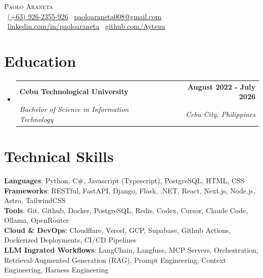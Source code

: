 \documentclass[letterpaper,11pt]{article}
\makeatletter
\newcommand{\resumeSubheading}[4]{
  \vspace{-2pt}\item
    \begin{tabular*}{1.0\textwidth}[t]{l@{\extracolsep{\fill}}r}
      \textbf{#1} & \textbf{\small #2} \\
      \textit{\small#3} & \textit{\small #4} \\
    \end{tabular*}\vspace{-7pt}
}
\newcommand{\resumeSubHeadingListStart}{\begin{itemize}[leftmargin=0.0in, label={}]}
\newcommand{\resumeSubHeadingListEnd}{\end{itemize}}\vspace{0pt}
\makeatother
\begin{document}
\begin{center}
    {\Large \scshape Paolo Araneta} \\[2mm]
    \footnotesize \raisebox{-0.1\height}
  \ \underline{(+63) 926-2355-926} \hspace{0.2em}\textbar\hspace{0.2em}
  {\  \underline{paoloaraneta008@gmail.com}} \hspace{0.2em}\textbar\hspace{0.2em}
  {\ \underline{\href{https://www.linkedin.com/in/paoloaraneta/}{linkedin.com/in/paoloaraneta}}} \hspace{0.2em}\textbar\hspace{0.2em}
  {\ \underline{\href{https://github.com/Aytsuu}{github.com/Aytsuu}}}
    \vspace{-8pt}
    \vspace{12pt}
\end{center}

\section{Education}
  \resumeSubHeadingListStart
    \resumeSubheading
      {Cebu Technological University}{August 2022 - July 2026}
      {Bachelor of Science in Information Technology
      }{Cebu City, Philippines}
  \resumeSubHeadingListEnd
    \vspace{-12pt}
\section{Technical Skills}
 \begin{itemize}[leftmargin=0.15in, label={}]
    \small{\item{   
      \textbf{Languages}{: Python, C\#, Javascript (Typescript), PostgreSQL, HTML, CSS} \\[1mm]
      \textbf{Frameworks}{: RESTful, FastAPI, Django, Flask, .NET, React, Next.js, Node.js, Astro, TailwindCSS} \\[1mm]
      \textbf{Tools}{: Git, Github, Docker, PostgreSQL, Redis, Codex, Cursor, Claude Code, Ollama, OpenRouter} \\[1mm]
      \textbf{Cloud \& DevOps}{: Cloudflare, Vercel, GCP, Supabase, Github Actions, Dockerized Deployments, CI/CD Pipelines} \\[1mm]
      \textbf{LLM Ingrated Workflows}{: LangChain, Langfuse, MCP Servers, Orchestration, Retrieval-Augmented Generation (RAG), Prompt Engineering, Context Engineering, Harness Engineering} \\[1mm]
    }}
 \end{itemize}
 \vspace{-16pt}
 \vspace{3pt}
\end{document}
